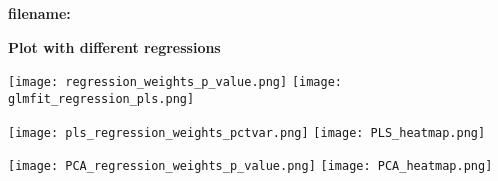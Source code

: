 \documentclass[12pt]{article}
\begin{document}
\begin{center}
\textbf{filename: \expandafter\detokenize\expandafter{\myvar}}

\textbf{Plot with different regressions}
\end{center}

\texttt{[image: regression\_weights\_p\_value.png]}
\texttt{[image: glmfit\_regression\_pls.png]}

\texttt{[image: pls\_regression\_weights\_pctvar.png]}
\texttt{[image: PLS\_heatmap.png]}


\texttt{[image: PCA\_regression\_weights\_p\_value.png]}
\texttt{[image: PCA\_heatmap.png]}
\end{document}
